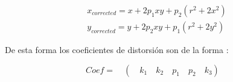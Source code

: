\begin{align}
{ x }_{ corrected }=x+2p_{ 1 }xy+p_{ 2 }({ r }^{ 2 }+2x^{ 2 })\\ { y }_{ corrected }=y+2p_{ 2 }xy+p_{ 1 }({ r }^{ 2 }+2y^{ 2 })
\end{align}


De esta forma los coeficientes de distorsión son de la forma :

\begin{equation}
Coef =\quad (\quad { k }_{ 1 }\quad { k }_{ 2 }\quad p_{ 1 }\quad p_{ 2 }\quad { k }_{ 3 })\quad 
\end{equation}

	






